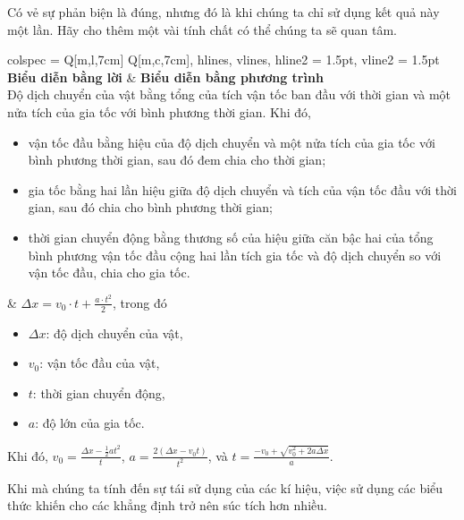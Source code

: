 Có vẻ sự phản biện là đúng, nhưng đó là khi chúng ta chỉ sử dụng kết quả này một lần. Hãy cho thêm một vài tính chất có thể chúng ta sẽ quan tâm.

\begin{table}[H]
   \centering
   \caption{So sánh cách biểu diễn bằng lời và bằng phương trình toán (nhiều tính chất).}
   \begin{tblr}{
      colspec = {Q[m,l,7cm] Q[m,c,7cm]},
      hlines, vlines,
      hline{2} = {1.5pt}, 
      vline{2} = {1.5pt}
   }
      \centering\textbf{Biểu diễn bằng lời} & \textbf{Biểu diễn bằng phương trình} \\
      Độ dịch chuyển của vật bằng tổng của tích vận tốc ban đầu với thời gian và một nửa tích của gia tốc với bình phương thời gian. Khi đó, \begin{itemize}
         \item vận tốc đầu bằng hiệu của độ dịch chuyển và một nửa tích của gia tốc với bình phương thời gian, sau đó đem chia cho thời gian;
         \item gia tốc bằng hai lần hiệu giữa độ dịch chuyển và tích của vận tốc đầu với thời gian, sau đó chia cho bình phương thời gian;
         \item thời gian chuyển động bằng thương số của hiệu giữa căn bậc hai của tổng bình phương vận tốc đầu cộng hai lần tích gia tốc và độ dịch chuyển so với vận tốc đầu, chia cho gia tốc.
      \end{itemize} & $\Delta x = v_0 \cdot t + \frac{a \cdot t^2}2$, trong đó \begin{itemize}
         \item $\Delta x$: độ dịch chuyển của vật,
         \item $v_0$: vận tốc đầu của vật,
         \item $t$: thời gian chuyển động,
         \item $a$: độ lớn của gia tốc. 
      \end{itemize}
      \begin{flushleft}
         Khi đó, $v_0 = \frac{\Delta x - \frac{1}{2}at^2}{t}$, $a = \frac{2(\Delta x - v_0 t)}{t^2}$, và $t = \frac{-v_0 + \sqrt{v_0^2 + 2a\Delta x}}{a}$.
      \end{flushleft}
   \end{tblr}
\end{table}

Khi mà chúng ta tính đến sự tái sử dụng của các kí hiệu, việc sử dụng các biểu thức khiến cho các khẳng định trở nên súc tích hơn nhiều.

